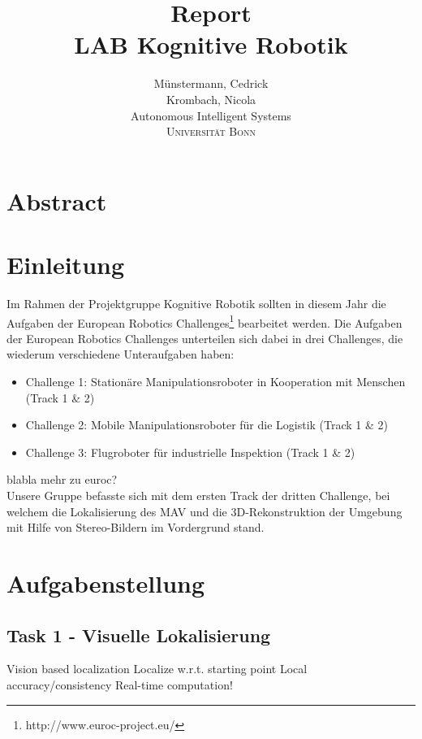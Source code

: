 \documentclass[12pt,titlepage, a4paper]{article}
\begin{document}
\title{Report\\LAB Kognitive Robotik}

\author{M\"unstermann,  Cedrick\\  Krombach, Nicola\\[1cm]
	Autonomous Intelligent Systems\\ \textsc{Universit\"at Bonn}\\}



\maketitle


\section*{Abstract}


\section{Einleitung}
Im Rahmen der Projektgruppe Kognitive Robotik sollten in diesem Jahr die Aufgaben der European Robotics Challenges\footnote{http://www.euroc-project.eu/} bearbeitet werden. 
Die Aufgaben der European Robotics Challenges unterteilen sich dabei in drei Challenges, die wiederum verschiedene Unteraufgaben haben:

\begin{itemize}
 \item Challenge 1: Station\"are Manipulationsroboter in Kooperation mit Menschen (Track 1 \& 2)
 \item Challenge 2: Mobile Manipulationsroboter f\"ur die Logistik (Track 1 \& 2)
 \item Challenge 3: Flugroboter f\"ur industrielle Inspektion (Track 1 \& 2)
\end{itemize}

blabla mehr zu euroc? \\
Unsere Gruppe befasste sich mit dem ersten Track der dritten Challenge, bei welchem die Lokalisierung des MAV und die 3D-Rekonstruktion der Umgebung mit Hilfe von Stereo-Bildern
im Vordergrund stand.


\section{Aufgabenstellung} 
\subsection{Task 1 - Visuelle Lokalisierung}
Vision based localization
Localize w.r.t. starting point
Local accuracy/consistency
Real-time computation!
\end{document}
